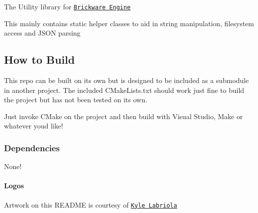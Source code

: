  

The Utility library for \href{http://github.com/Honeybunch/Brickware-Engine}{\tt Brickware Engine}

This mainly contains static helper classes to aid in string manipulation, filesystem access and J\+S\+O\+N parsing 



\subsection*{How to Build}

This repo can be built on its own but is designed to be included as a submodule in another project. The included C\+Make\+Lists.\+txt should work just fine to build the project but has not been tested on its own.

Just invoke C\+Make on the project and then build with Visual Studio, Make or whatever you\textquotesingle{}d like!

\subsubsection*{Dependencies}

None!

\paragraph*{Logos}

Artwork on this R\+E\+A\+D\+M\+E is courtesy of \href{http://www.kylelabriola.com/}{\tt Kyle Labriola} 